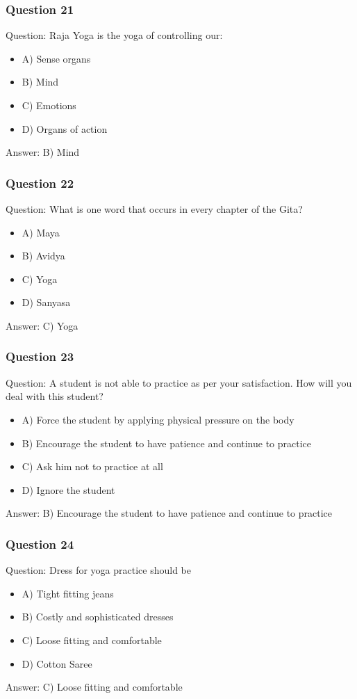 \begin{frame}[fragile]\frametitle{Question 21}
Question: Raja Yoga is the yoga of controlling our:
\begin{itemize}
\item A) Sense organs
\item B) Mind
\item C) Emotions
\item D) Organs of action
\end{itemize}
Answer: B) Mind
\end{frame}

\begin{frame}[fragile]\frametitle{Question 22}
Question: What is one word that occurs in every chapter of the Gita?
\begin{itemize}
\item A) Maya
\item B) Avidya
\item C) Yoga
\item D) Sanyasa
\end{itemize}
Answer: C) Yoga
\end{frame}

\begin{frame}[fragile]\frametitle{Question 23}
Question: A student is not able to practice as per your satisfaction. How will you deal with this student?
\begin{itemize}
\item A) Force the student by applying physical pressure on the body
\item B) Encourage the student to have patience and continue to practice
\item C) Ask him not to practice at all
\item D) Ignore the student
\end{itemize}
Answer: B) Encourage the student to have patience and continue to practice
\end{frame}

\begin{frame}[fragile]\frametitle{Question 24}
Question: Dress for yoga practice should be
\begin{itemize}
\item A) Tight fitting jeans
\item B) Costly and sophisticated dresses
\item C) Loose fitting and comfortable
\item D) Cotton Saree
\end{itemize}
Answer: C) Loose fitting and comfortable
\end{frame}

